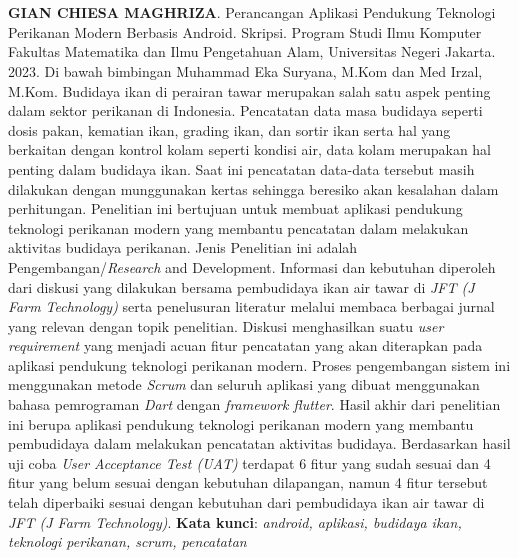 \chapter*{}

\begin{spacing}{1}
\textbf{GIAN CHIESA MAGHRIZA}. Perancangan Aplikasi Pendukung Teknologi Perikanan Modern Berbasis Android. Skripsi. Program Studi Ilmu Komputer Fakultas Matematika dan Ilmu Pengetahuan Alam, Universitas Negeri Jakarta. 2023. Di bawah bimbingan Muhammad Eka Suryana, M.Kom dan Med Irzal, M.Kom.
\newline
\newline
Budidaya ikan di perairan tawar merupakan salah satu aspek penting dalam sektor perikanan di Indonesia. Pencatatan data masa budidaya seperti dosis pakan, kematian ikan, grading ikan, dan sortir ikan serta hal yang berkaitan dengan kontrol kolam seperti kondisi air, data kolam merupakan hal penting dalam budidaya ikan. Saat ini pencatatan data-data tersebut masih dilakukan dengan munggunakan kertas sehingga beresiko akan kesalahan dalam perhitungan. Penelitian ini bertujuan untuk membuat aplikasi pendukung teknologi perikanan modern yang membantu pencatatan dalam melakukan aktivitas budidaya perikanan. Jenis Penelitian ini adalah Pengembangan/\textit{Research} and Development. Informasi dan kebutuhan diperoleh dari diskusi yang dilakukan bersama pembudidaya ikan air tawar di \textit{JFT (J Farm Technology)} serta penelusuran literatur melalui membaca berbagai jurnal yang relevan dengan topik penelitian. Diskusi menghasilkan suatu \textit{user requirement} yang menjadi acuan fitur pencatatan yang akan diterapkan pada aplikasi pendukung teknologi perikanan modern. Proses pengembangan sistem ini menggunakan metode \textit{Scrum} dan seluruh aplikasi yang dibuat menggunakan bahasa pemrograman \textit{Dart} dengan \textit{framework flutter}. Hasil akhir dari penelitian ini berupa aplikasi pendukung teknologi perikanan modern yang membantu pembudidaya dalam melakukan pencatatan aktivitas budidaya. Berdasarkan hasil uji coba \textit{User Acceptance Test (UAT)} terdapat 6 fitur yang sudah sesuai dan 4 fitur yang belum sesuai dengan kebutuhan dilapangan, namun 4 fitur tersebut telah diperbaiki sesuai dengan kebutuhan dari pembudidaya ikan air tawar di \textit{JFT (J Farm Technology)}.
\newline
\newline
\noindent \textbf{Kata kunci}: \textit{android, aplikasi, budidaya ikan, teknologi perikanan, scrum, pencatatan}
\end{spacing}